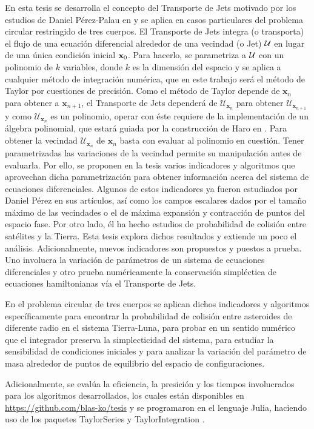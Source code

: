 En esta tesis se desarrolla el concepto del Transporte de Jets motivado por los estudios de Daniel Pérez-Palau en \cite{Perez2013, Perez2015} y se aplica en casos particulares del problema circular restringido de tres cuerpos. El Transporte de Jets integra (o transporta) el flujo de una ecuación diferencial alrededor de una vecindad (o Jet) $\mathcal{U}$ en lugar de una única  condición inicial $\mathbf{x}_0$. Para hacerlo, se parametriza a $\mathcal{U}$ con un polinomio de $k$ variables, donde $k$ es la dimensión del espacio y se aplica a cualquier método de integración numérica, que en este trabajo será el método de Taylor por cuestiones de precisión. Como el método de Taylor depende de $\mathbf{x}_n$ para obtener a $\mathbf{x}_{n+1}$, el Transporte de Jets dependerá de $\mathcal{U}_{\mathbf{x}_n}$ para obtener $\mathcal{U}_{\mathbf{x}_{n+1}}$ y como $\mathcal{U}_{\mathbf{x}_n}$ es un polinomio, operar con éste requiere de la implementación de un álgebra polinomial, que estará guiada por la construcción de Haro en \cite{Haro2009}. Para obtener la vecindad $\mathcal{U}_{\mathbf{x}_n}$ de $\mathbf{x}_n$ basta con evaluar al polinomio en cuestión. Tener parametrizadas las variaciones de la vecindad permite su manipulación antes de evaluarla. Por ello, se proponen en la tesis varios indicadores y algoritmos que aprovechan dicha parametrización para obtener información acerca del sistema de ecuaciones diferenciales. Algunos de estos indicadores ya fueron estudiados por Daniel Pérez en sus artículos, así como los campos escalares dados por el tamaño máximo de las vecindades o el de máxima expansión y contracción de puntos del espacio fase. Por otro lado, él ha hecho estudios de probabilidad de colisión entre satélites y la Tierra. Esta tesis explora dichos resultados y extiende un poco el análisis. Adicionalmente, nuevos indicadores son propuestos y puestos a prueba. Uno involucra la variación de parámetros de un sistema de ecuaciones diferenciales y otro prueba numéricamente la conservación simpléctica de ecuaciones hamiltonianas vía el Transporte de Jets.


En el problema circular de tres cuerpos se aplican dichos indicadores y algoritmos específicamente para encontrar la probabilidad de colisión entre asteroides de diferente radio en el sistema Tierra-Luna, para probar en un sentido numérico que el integrador preserva la simplecticidad del sistema, para estudiar la sensibilidad de condiciones iniciales y para analizar la variación del parámetro de masa alrededor de puntos de equilibrio del espacio de configuraciones.  

Adicionalmente, se evalúa la eficiencia, la presición y los tiempos involucrados para los algoritmos desarrollados, los cuales están disponibles en \href{https://github.com/blas-ko/tesis}{https://github.com/blas-ko/tesis} y se programaron en el lenguaje Julia, haciendo uso de los paquetes \textsf{TaylorSeries} \cite{TaylorSeries} y \textsf{TaylorIntegration} \cite{TaylorIntegration}. 
